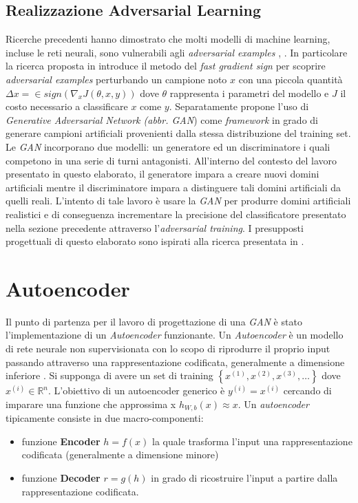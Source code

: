 \subsection{Realizzazione Adversarial Learning}
\label{adv}
Ricerche precedenti hanno dimostrato che molti modelli di machine learning, incluse le reti neurali, sono vulnerabili agli \textit{adversarial examples} \cite{1312.6199},  \cite{1412.6572}. In particolare la ricerca proposta in \cite{1412.6572} introduce il metodo del \textit{fast gradient sign} per scoprire \textit{adversarial examples} perturbando un campione noto $x$ con una piccola quantità $\Delta x =  \in sign(\nabla_x J(\theta,x,y))$ dove $\theta$ rappresenta i parametri del modello e $J$ il costo necessario a classificare $x$ come $y$.
Separatamente \cite{1406.2661} propone l'uso di \textit{Generative Adversarial Network (abbr. GAN})  come \textit{framework} in grado di generare campioni artificiali provenienti dalla stessa distribuzione del training set.
Le \textit{GAN} incorporano due modelli: un generatore ed un discriminatore i quali competono in una serie di turni antagonisti. All'interno del contesto del lavoro presentato in questo elaborato, il generatore impara a creare nuovi domini artificiali mentre il discriminatore impara a distinguere tali domini artificiali da quelli reali. L'intento di tale lavoro è usare la \textit{GAN} per produrre domini artificiali realistici e di conseguenza incrementare la precisione del classificatore presentato nella sezione precedente attraverso l'\textit{adversarial training}. I presupposti progettuali di questo elaborato sono ispirati alla ricerca presentata in \cite{deepdga}.

\section{Autoencoder}
\label{autoencoder}
Il punto di partenza per il lavoro di progettazione di una \textit{GAN} è stato l'implementazione di un \textit{Autoencoder} funzionante.  Un \textit{Autoencoder} è un modello di rete neurale non supervisionata con lo scopo di riprodurre il proprio input passando attraverso una rappresentazione codificata, generalmente a dimensione inferiore \cite{MAL-006} \cite{Liou:2008:MWP:1411851.1412074}. Si supponga di avere un set di training $\left\{ x^{(1)}, x^{(2)}, x^{(3)}, \ldots \right\}$ dove $x^{(i)} \in \mathbb{R}^n$. L'obiettivo di un autoencoder generico è $y^{(i)} = x^{(i)}$ cercando di imparare una funzione che approssima x $h_{W,b}(x) \approx x$. Un \textit{autoencoder} tipicamente consiste in due macro-componenti:
\begin{itemize}
\item funzione \textbf{Encoder} $h = f(x)$ la quale trasforma l'input una rappresentazione codificata (generalmente a dimensione minore)
\item funzione \textbf{Decoder} $r = g(h)$ in grado di ricostruire l'input a partire dalla rappresentazione codificata. 
\end{itemize}


